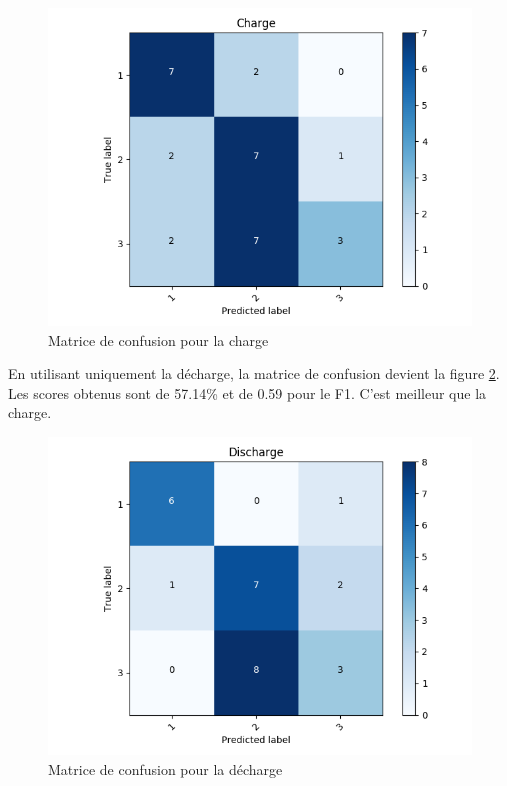 \begin{figure}
    \centering
    \includegraphics[scale=0.5]{images/Confcha.png}
    \caption{Matrice de confusion pour la charge}
    \label{fig:HMMconfCha}
\end{figure}

En utilisant uniquement la décharge, la matrice de confusion devient la figure \ref{fig:HMMconfDecha}. Les scores obtenus sont de 57.14\% et de 0.59 pour le F1. C'est meilleur que la charge. 

\begin{figure}
    \centering
    \includegraphics[scale=0.5]{images/Confdech.png}
    \caption{Matrice de confusion pour la décharge}
    \label{fig:HMMconfDecha}
\end{figure}

